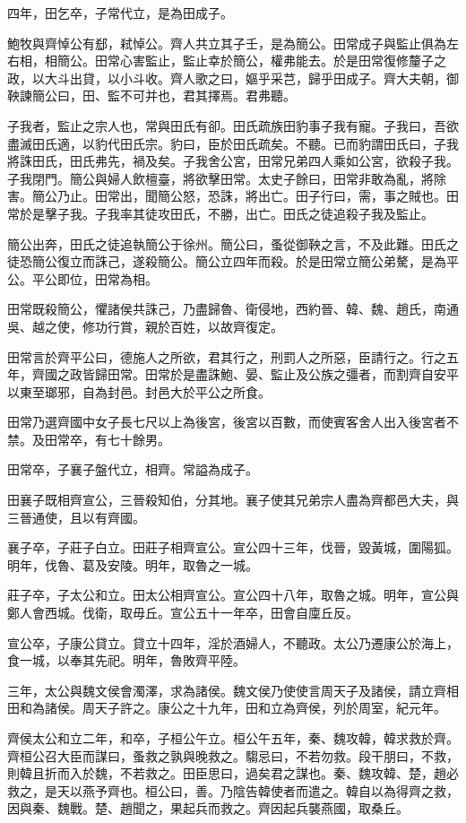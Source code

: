 四年，田乞卒，子常代立，是為田成子。

鮑牧與齊悼公有郄，弒悼公。齊人共立其子壬，是為簡公。田常成子與監止俱為左右相，相簡公。田常心害監止，監止幸於簡公，權弗能去。於是田常復修釐子之政，以大斗出貸，以小斗收。齊人歌之曰，嫗乎采芑，歸乎田成子。齊大夫朝，御鞅諫簡公曰，田、監不可并也，君其擇焉。君弗聽。

子我者，監止之宗人也，常與田氏有卻。田氏疏族田豹事子我有寵。子我曰，吾欲盡滅田氏適，以豹代田氏宗。豹曰，臣於田氏疏矣。不聽。已而豹謂田氏曰，子我將誅田氏，田氏弗先，禍及矣。子我舍公宮，田常兄弟四人乘如公宮，欲殺子我。子我閉門。簡公與婦人飲檀臺，將欲擊田常。太史子餘曰，田常非敢為亂，將除害。簡公乃止。田常出，聞簡公怒，恐誅，將出亡。田子行曰，需，事之賊也。田常於是擊子我。子我率其徒攻田氏，不勝，出亡。田氏之徒追殺子我及監止。

簡公出奔，田氏之徒追執簡公于徐州。簡公曰，蚤從御鞅之言，不及此難。田氏之徒恐簡公復立而誅己，遂殺簡公。簡公立四年而殺。於是田常立簡公弟驁，是為平公。平公即位，田常為相。

田常既殺簡公，懼諸侯共誅己，乃盡歸魯、衛侵地，西約晉、韓、魏、趙氏，南通吳、越之使，修功行賞，親於百姓，以故齊復定。

田常言於齊平公曰，德施人之所欲，君其行之，刑罰人之所惡，臣請行之。行之五年，齊國之政皆歸田常。田常於是盡誅鮑、晏、監止及公族之彊者，而割齊自安平以東至瑯邪，自為封邑。封邑大於平公之所食。

田常乃選齊國中女子長七尺以上為後宮，後宮以百數，而使賓客舍人出入後宮者不禁。及田常卒，有七十餘男。

田常卒，子襄子盤代立，相齊。常謚為成子。

田襄子既相齊宣公，三晉殺知伯，分其地。襄子使其兄弟宗人盡為齊都邑大夫，與三晉通使，且以有齊國。

襄子卒，子莊子白立。田莊子相齊宣公。宣公四十三年，伐晉，毀黃城，圍陽狐。明年，伐魯、葛及安陵。明年，取魯之一城。

莊子卒，子太公和立。田太公相齊宣公。宣公四十八年，取魯之城。明年，宣公與鄭人會西城。伐衛，取毋丘。宣公五十一年卒，田會自廩丘反。

宣公卒，子康公貸立。貸立十四年，淫於酒婦人，不聽政。太公乃遷康公於海上，食一城，以奉其先祀。明年，魯敗齊平陸。

三年，太公與魏文侯會濁澤，求為諸侯。魏文侯乃使使言周天子及諸侯，請立齊相田和為諸侯。周天子許之。康公之十九年，田和立為齊侯，列於周室，紀元年。

齊侯太公和立二年，和卒，子桓公午立。桓公午五年，秦、魏攻韓，韓求救於齊。齊桓公召大臣而謀曰，蚤救之孰與晚救之。騶忌曰，不若勿救。段干朋曰，不救，則韓且折而入於魏，不若救之。田臣思曰，過矣君之謀也。秦、魏攻韓、楚，趙必救之，是天以燕予齊也。桓公曰，善。乃陰告韓使者而遣之。韓自以為得齊之救，因與秦、魏戰。楚、趙聞之，果起兵而救之。齊因起兵襲燕國，取桑丘。

